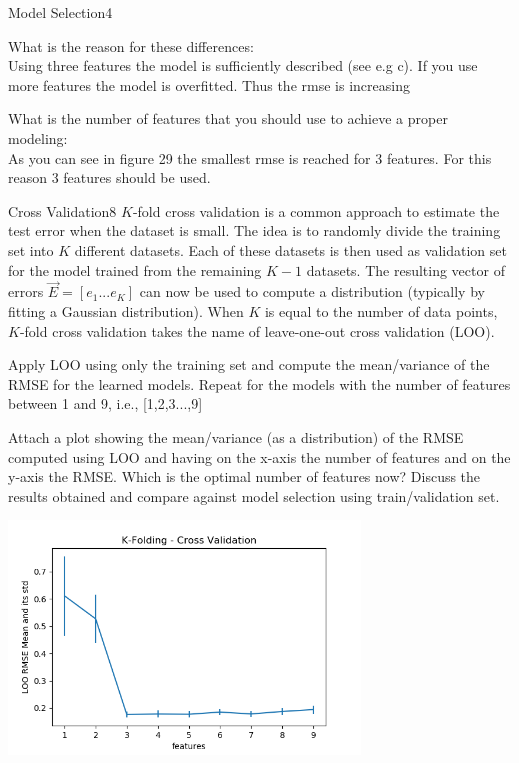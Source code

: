\begin{questions}
\begin{question}{Model Selection}{4}
\begin{answer}
	What is the reason for these differences:\\
	Using three features the model is sufficiently described (see e.g c). If you use more features the model is overfitted. Thus the rmse is increasing
	
	
	What is the number of features that you should use to achieve a proper modeling:\\
	As you can see in figure 29 the smallest rmse is reached for 3 features. For this reason 3 features should be used.
	\end{answer}
	\end{question}
	
	
	\begin{question}{Cross Validation}{8}
		$K$-fold cross validation is a common approach to estimate the test error when the dataset is small.
		The idea is to randomly divide the training set into $K$ different datasets.
		Each of these datasets is then used as validation set for the model trained from the remaining $K-1$ datasets.
		The resulting vector of errors $\vec E = [ e_1... e_K ]$ can now be used to compute a distribution (typically by fitting a Gaussian distribution).
		When $K$ is equal to the number of data points, $K$-fold cross validation takes the name of leave-one-out cross validation (LOO).
		
		Apply LOO using only the training set and compute the mean/variance of the RMSE for the learned models. 
		Repeat for the models with the number of features between 1 and 9, i.e.,  [1,2,3...,9]
		
		Attach a plot showing the mean/variance (as a distribution) of the RMSE computed using LOO and having on the x-axis the number of features and on the y-axis the RMSE.
		Which is the optimal number of features now? 
		Discuss the results obtained and compare against model selection using train/validation set.
		
\begin{answer}
		\begin{center}
			\includegraphics[width=0.7\textwidth]{img/3f.png} 
		\end{center}
	

\end{answer}
\end{question}
\end{questions}
